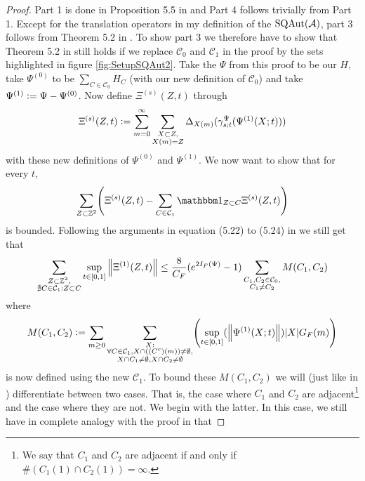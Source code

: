 \documentclass[11pt,a4paper,twoside]{article}
\numberwithin{equation}{section}
\begin{document}
	\begin{proof}
		Part 1 is done in Proposition 5.5 in \cite{ogata2021h3gmathbb} and Part 4 follows trivially from Part 1. Except for the translation operators in my definition of the $\textrm{SQAut}(\AA)$, part 3 follows from Theorem 5.2 in \cite{ogata2021h3gmathbb}. To show part 3 we therefore have to show that Theorem 5.2 in \cite{ogata2021h3gmathbb} still holds if we replace $\mathcal{C}_0$ and $\mathcal{C}_1$ in the proof by the sets highlighted in figure \ref{fig:SetupSQAut2}. Take the $\Psi$ from this proof to be our $H$, take $\Psi^{(0)}$ to be $\sum_{C\in\mathcal{C}_0}H_{C}$ (with our new definition of $\mathcal{C}_0$) and take $\Psi^{(1)}\defeq \Psi-\Psi^{(0)}$. Now define $\Xi^{(s)}(Z,t)$ through
		\begin{equation}\label{eq:PropertiesLocallyGeneratedAutomorphismsProofDefinitionXi}
			\Xi^{(s)}(Z,t)\defeq\sum_{m=0}^\infty \sum_{\substack{X\subset Z,\\X(m)=Z}}\Delta_{X(m)}(\gamma^\Psi_{s;t}(\Psi^{(1)}(X;t)))
		\end{equation}
		with these new definitions of $\Psi^{(0)}$ and $\Psi^{(1)}$. We now want to show that for every $t$,
		\begin{equation}
			\sum_{Z\subset\ZZ^2}\left(\Xi^{(s)}(Z,t)-\sum_{C\in\mathcal{C}_1}\id_{Z\subset C}\Xi^{(s)}(Z,t)\right)
		\end{equation}
		is bounded. Following the arguments in equation (5.22) to (5.24) in \cite{ogata2021h3gmathbb} we still get that
		\begin{equation}
			\sum_{\substack{Z\subset\ZZ^2,\\\nexists C\in\mathcal{C}_1:Z\subset C}}\sup_{t\in[0,1]}\norm{\Xi^{(1)}(Z,t)}\leq \frac{8}{C_F}(e^{2I_F(\Psi)}-1)\sum_{\substack{C_1,C_2\in\mathcal{C}_0,\\ C_1\neq C_2}}M(C_1,C_2)
		\end{equation}
		where
		\begin{equation}
			M(C_1,C_2)\defeq \sum_{m\geq 0}\sum_{\substack{X:\\\forall C\in\mathcal{C}_1,X\cap((C^c)(m))\neq\emptyset,\\X\cap C_1\neq\emptyset,X\cap C_2\neq\emptyset}}\left(\sup_{t\in[0,1]}(\norm{\Psi^{(1)}(X;t)})\abs{X}G_F(m)\right)
		\end{equation}
		is now defined using the new $\mathcal{C}_1$. To bound these $M(C_1,C_2)$ we will (just like in \cite{ogata2021h3gmathbb}) differentiate between two cases. That is, the case where $C_1$ and $C_2$ are adjacent\footnote{We say that $C_1$ and $C_2$ are adjacent if and only if $\#(C_1(1)\cap C_2(1))=\infty$.} and the case where they are not. We begin with the latter. In this case, we still have in complete analogy with the proof in \cite{ogata2021h3gmathbb} that

\end{proof}
\end{document}
